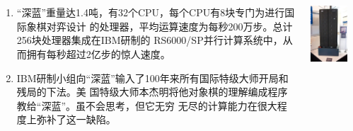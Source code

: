 \begin{frame}[fragile]
  \frametitle{~}
  \begin{columns}
    \begin{column}[T]{.65\linewidth}
      \begin{enumerate}
      \item “深蓝”重量达1.4吨，有32个CPU，每个CPU有8块专门为进行国际象棋对弈设计
        的处理器，平均运算速度为每秒200万步。总计256块处理器集成在IBM研制的
        RS6000/SP并行计算系统中，从而拥有每秒超过2亿步的惊人速度。

      \item IBM研制小组向“深蓝”输入了100年来所有国际特级大师开局和残局的下法。美
        国特级大师本杰明将他对象棋的理解编成程序教给“深蓝”。虽不会思考，但它无穷
        无尽的计算能力在很大程度上弥补了这一缺陷。
      \end{enumerate}
    \end{column}
    \begin{column}[T]{.3\linewidth}
      \includegraphics[width=0.8\textwidth]{figs/intro/deep_blue_3.png}
    \end{column}
  \end{columns}
\end{frame}

